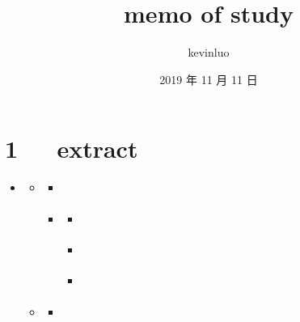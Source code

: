 \documentclass[letterpaper,12pt,english]{sphinxmanual}
\title{memo of study}
\date{2019 年 11 月 11 日}
\author{kevinluo}
\begin{document}
\pagestyle{empty}
\sphinxmaketitle
\pagestyle{plain}
\sphinxtableofcontents
\pagestyle{normal}
\label{\detokenize{index::doc}}



\chapter{1   extract}
\label{\detokenize{000misc/extract:extract}}\label{\detokenize{000misc/extract::doc}}
\begin{sphinxShadowBox}
\begin{itemize}
\item {} 
\label{\detokenize{000misc/extract:id8}}{\hyperref[\detokenize{000misc/extract:extract}]{}}
\begin{itemize}
\item {} 
\label{\detokenize{000misc/extract:id9}}{\hyperref[\detokenize{000misc/extract:id2}]{}}
\begin{itemize}
\item {} 
\label{\detokenize{000misc/extract:id10}}{\hyperref[\detokenize{000misc/extract:id3}]{}}

\item {} 
\label{\detokenize{000misc/extract:id11}}{\hyperref[\detokenize{000misc/extract:c4d-3dmax-maya}]{}}
\begin{itemize}
\item {} 
\label{\detokenize{000misc/extract:id12}}{\hyperref[\detokenize{000misc/extract:dmax-c4d}]{}}

\item {} 
\label{\detokenize{000misc/extract:id13}}{\hyperref[\detokenize{000misc/extract:dmaxmayac4d}]{}}

\item {} 
\label{\detokenize{000misc/extract:id14}}{\hyperref[\detokenize{000misc/extract:c4d-c4d}]{}}

\end{itemize}

\end{itemize}

\item {} 
\label{\detokenize{000misc/extract:id15}}{\hyperref[\detokenize{000misc/extract:id4}]{}}
\begin{itemize}
\item {} 
\label{\detokenize{000misc/extract:id16}}{\hyperref[\detokenize{000misc/extract:graphviz}]{}}


\end{itemize}
\end{itemize}
\end{itemize}
\end{sphinxShadowBox}
\end{document}
